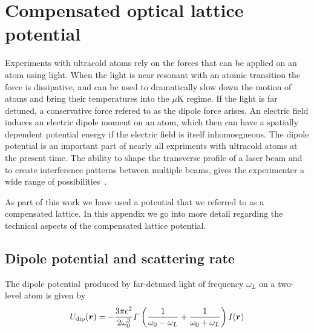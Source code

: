 
\chapter{Compensated optical lattice potential}
\label{app:lattice}

Experiments with ultracold atoms rely on the forces that can be applied on an
atom using light.   When the light is near resonant with an atomic transition
the force is dissipative, and can be used to dramatically slow down the motion
of atoms and bring their temperatures into the $\mu$K regime.  If the light is
far detuned, a conservative force refered to as the dipole force arises.  An
electric field induces an electric dipole moment on an atom, which then can
have a spatially dependent potential energy if the electric field is itself
inhomoegneous.  The dipole potential is an important part of nearly all
expriments with ultracold atoms at the present time.  The ability to shape the
transverse profile of a laser beam and to create interference patterns between
multiple beams, gives the experimenter a wide range of
possibilities~\cite{Grimm2000b}.  

As part of this work we have used a potential that we referred to as a
compensated lattice.  In this appendix we go into more detail
regarding the technical aspects of the compensated lattice potential.  


\section{Dipole potential and scattering rate}

The dipole potential\,\cite{Grimm2000b} produced by far-detuned light of
frequency $\omega_{L}$ on a two-level atom is given by
\begin{equation}
  U_{\text{dip}}(\bm{r}) = - 
  \frac{3\pi c^{2}}{ 2 \omega_{0}^{3} } \Gamma
  \left( \frac{1}{\omega_{0} - \omega_{L}} + \frac{1}{\omega_{0} 
   + \omega_{L}}  \right) I(\bm{r}) 
\end{equation}

